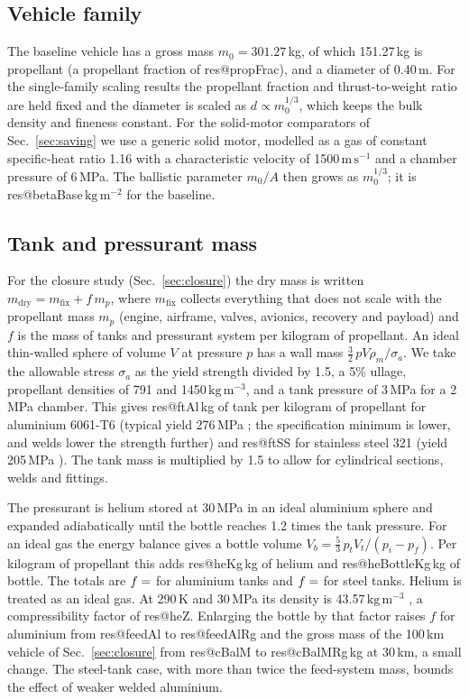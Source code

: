 \documentclass[11pt,a4paper]{article}
\makeatletter
\newcommand{\R}[1]{\csname res@#1\endcsname}
\newcommand{\ms}{\,\mathrm{m\,s^{-1}}}
\newcommand{\kgm}{\,\mathrm{kg\,m^{-3}}}
\makeatother
\begin{document}
\subsection{Vehicle family}
\label{sec:family}

The baseline vehicle has a gross mass $m_0=301.27$\,kg, of which 151.27\,kg is propellant (a propellant fraction of \R{propFrac}), and a diameter of 0.40\,m. For the single-family scaling results the propellant fraction and thrust-to-weight ratio are held fixed and the diameter is scaled as $d\propto m_0^{1/3}$, which keeps the bulk density and fineness constant. For the solid-motor comparators of Sec.~\ref{sec:saving} we use a generic solid motor, modelled as a gas of constant specific-heat ratio 1.16 with a characteristic velocity of 1500$\ms$ and a chamber pressure of 6\,MPa. The ballistic parameter $m_0/A$ then grows as $m_0^{1/3}$; it is \R{betaBase}$\,\mathrm{kg\,m^{-2}}$ for the baseline.

\subsection{Tank and pressurant mass}
\label{sec:tanks}

For the closure study (Sec.~\ref{sec:closure}) the dry mass is written $m_{\mathrm{dry}}=m_{\mathrm{fix}}+f\,m_p$, where $m_{\mathrm{fix}}$ collects everything that does not scale with the propellant mass $m_p$ (engine, airframe, valves, avionics, recovery and payload) and $f$ is the mass of tanks and pressurant system per kilogram of propellant. An ideal thin-walled sphere of volume $V$ at pressure $p$ has a wall mass $\tfrac32\,pV\rho_m/\sigma_a$. We take the allowable stress $\sigma_a$ as the yield strength divided by 1.5, a 5\% ullage, propellant densities of 791 and 1450$\kgm$, and a tank pressure of 3\,MPa for a 2\,MPa chamber. This gives \R{ftAl}\,kg of tank per kilogram of propellant for aluminium 6061-T6 (typical yield 276\,MPa \cite{asm}; the specification minimum is lower, and welds lower the strength further) and \R{ftSS} for stainless steel 321 (yield 205\,MPa \cite{astm}). The tank mass is multiplied by 1.5 to allow for cylindrical sections, welds and fittings.

The pressurant is helium stored at 30\,MPa in an ideal aluminium sphere and expanded adiabatically until the bottle reaches 1.2 times the tank pressure. For an ideal gas the energy balance gives a bottle volume $V_b=\tfrac53\,p_tV_t/(p_i-p_f)$. Per kilogram of propellant this adds \R{heKg}\,kg of helium and \R{heBottleKg}\,kg of bottle. The totals are $f=\R{feedAl}$ for aluminium tanks and $f=\R{feedSS}$ for steel tanks. Helium is treated as an ideal gas. At 290\,K and 30\,MPa its density is 43.57$\kgm$ \cite{nist}, a compressibility factor of \R{heZ}. Enlarging the bottle by that factor raises $f$ for aluminium from \R{feedAl} to \R{feedAlRg} and the gross mass of the 100\,km vehicle of Sec.~\ref{sec:closure} from \R{cBalM} to \R{cBalMRg}\,kg at 30\,km, a small change. The steel-tank case, with more than twice the feed-system mass, bounds the effect of weaker welded aluminium.
\end{document}
